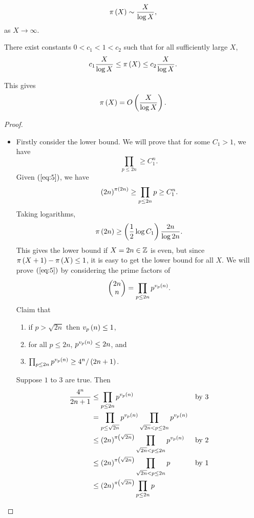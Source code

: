 \begin{theorem}
$$ \pi\left( X \right) \sim \dfrac{X}{\log X}, $$
as $ X \to \infty $.
\end{theorem}

\begin{theorem}
There exist constants $ 0 < c_1 < 1 < c_2 $ such that for all sufficiently large $ X $,
$$ c_1\dfrac{X}{\log X} \le \pi\left( X \right) \le c_2\dfrac{X}{\log X}. $$
\end{theorem}

This gives
$$ \pi\left( X \right) = O\left( \dfrac{X}{\log X} \right). $$


\begin{proof}
\hfill
\begin{itemize}
\item Firstly consider the lower bound. We will prove that for some $ C_1 > 1 $, we have
\begin{equation}
\label{eq:5}
\prod_{p \le 2n} \ge C_1^n.
\end{equation}
Given $ \left( \ref{eq:5} \right) $, we have
$$ \left( 2n \right)^{\pi\left( 2n \right)} \ge \prod_{p \le 2n} p \ge C_1^n. $$
Taking logarithms,
$$ \pi\left( 2n \right) \ge \left( \dfrac{1}{2}\log C_1 \right)\dfrac{2n}{\log 2n}. $$
This gives the lower bound if $ X = 2n \in \mathbb{Z} $ is even, but since $ \pi\left( X + 1 \right) - \pi\left( X \right) \le 1 $, it is easy to get the lower bound for all $ X $. We will prove $ \left( \ref{eq:5} \right) $ by considering the prime factors of
$$ \begin{pmatrix} 2n \\ n \end{pmatrix} = \prod_{p \le 2n} p^{v_p\left( n \right)}. $$
Claim that
\begin{enumerate}
\item if $ p > \sqrt{2n} $ then $ v_p\left( n \right) \le 1 $,
\item for all $ p \le 2n $, $ p^{v_p\left( n \right)} \le 2n $, and
\item $ \prod_{p \le 2n} p^{v_p\left( n \right)} \ge 4^n / \left( 2n + 1 \right) $.
\end{enumerate}
Suppose $ 1 $ to $ 3 $ are true. Then
\begin{align*}
\dfrac{4^n}{2n + 1}
& \le \prod_{p \le 2n} p^{v_p\rb{n}} & \text{by} \ 3 \\
& = \prod_{p \le \sqrt{2n}} p^{v_p\rb{n}} \prod_{\sqrt{2n} < p \le 2n} p^{v_p\rb{n}} \\
& \le \rb{2n}^{\pi\rb{\sqrt{2n}}} \prod_{\sqrt{2n} < p \le 2n} p^{v_p\rb{n}} & \text{by} \ 2 \\
& \le \rb{2n}^{\pi\rb{\sqrt{2n}}} \prod_{\sqrt{2n} < p \le 2n} p & \text{by} \ 1 \\
& \le \rb{2n}^{\pi\rb{\sqrt{2n}}} \prod_{p \le 2n} p \\

\end{align*}
\end{itemize}
\end{proof}
